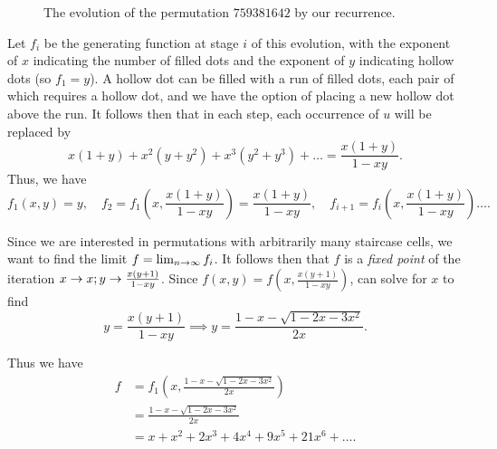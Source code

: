 \begin{figure}[t]
      \caption{The evolution of the permutation $759381642$ by our recurrence.}
      \label{involutions:fig:perm-iteration}
    \end{figure}

    Let $f_i$ be the generating function at stage $i$ of this evolution, with the
    exponent of $x$ indicating the number of filled dots and the exponent of
    $y$ indicating hollow dots (so $f_1 = y$). A hollow dot can be filled with
    a run of filled dots, each pair of which requires a hollow dot, and we have
    the option of placing a new hollow dot above the run. It follows then that
    in each step, each occurrence of $u$ will be replaced by 
    $$ x(1+y) + x^2(y+y^2) + x^3 (y^2 + y^3) + \dots = \frac{x(1+y)}{1-xy}. $$ 
    Thus, we have
    {\small
    $$ f_1(x,y) = y, \quad f_2 
      = f_1\left(x, \frac{x(1+y)}{1-xy}\right) = \frac{x(1+y)}{1 - xy}, \quad 
      f_{i+1} = f_i\left(x, \frac{x(1+y)}{1-xy}\right) \dots .$$
    }

    Since we are interested in permutations with arbitrarily many staircase
    cells, we want to find the limit $f = \lim_{n \rightarrow \infty} f_i $. It follows then that $f$
    is a \emph{fixed point} of the iteration $x \rightarrow x; y \rightarrow \frac{x(y+1)}{1 -
    xy}$. Since $f(x,y) = f\left(x, \frac{x(y+1)}{1 - xy}\right)$, can solve
    for $x$ to find
    $$ y = \frac{x(y+1)}{1 - xy} \implies 
       y = \frac{1 - x - \sqrt{1 - 2x - 3x^2}}{2x}.$$

    Thus we have
    $$ \begin{aligned}
      f &= f_1\left(x,\frac{1 - x - \sqrt{1 - 2x - 3x^2}}{2x}\right)\\
        &= \frac{1 - x - \sqrt{1 - 2x - 3x^2}}{2x} \\
        &= x + x^2 + 2x^3 + 4x^4 + 9x^5 + 21x^6 + \dots.
    \end{aligned} $$


